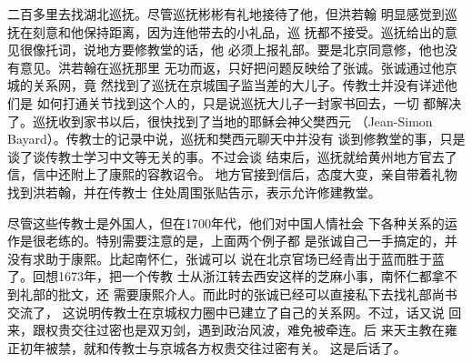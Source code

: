 二百多里去找湖北巡抚。尽管巡抚彬彬有礼地接待了他，但洪若翰%
明显感觉到巡抚在刻意和他保持距离，因为连他带去的小礼品，巡%
抚都不接受。巡抚给出的意见很像托词，说地方要修教堂的话，他%
必须上报礼部。要是北京同意修，他也没有意见。洪若翰在巡抚那里%
无功而返，只好把问题反映给了张诚。张诚通过他京城的关系网，竟%
然找到了巡抚在京城国子监当差的大儿子。传教士并没有详述他们是%
如何打通关节找到这个人的，只是说巡抚大儿子一封家书回去，一切%
都解决了。巡抚收到家书以后，很快找到了当地的耶稣会神父樊西元%
（Jean-Simon Bayard）。传教士的记录中说，巡抚和樊西元聊天中并没有%
谈到修教堂的事，只是谈了谈传教士学习中文等无关的事。不过会谈%
结束后，巡抚就给黄州地方官去了信，信中还附上了康熙的容教诏令。%
地方官接到信后，态度大变，亲自带着礼物找到洪若翰，并在传教士%
住处周围张贴告示，表示允许修建教堂。%
\par
尽管这些传教士是外国人，但在1700年代，他们对中国人情社会%
下各种关系的运作是很老练的。特别需要注意的是，上面两个例子都%
是张诚自己一手搞定的，并没有求助于康熙。比起南怀仁，张诚可以%
说在北京官场已经青出于蓝而胜于蓝了。回想1673年，把一个传教%
士从浙江转去西安这样的芝麻小事，南怀仁都拿不到礼部的批文，还%
需要康熙介人。而此时的张诚已经可以直接私下去找礼部尚书交流了，%
这说明传教士在京城权力圈中已建立了自己的关系网。不过，话又说%
回来，跟权贵交往过密也是双刃剑，遇到政治风波，难免被牵连。后%
来天主教在雍正初年被禁，就和传教士与京城各方权贵交往过密有关。%
这是后话了。%

